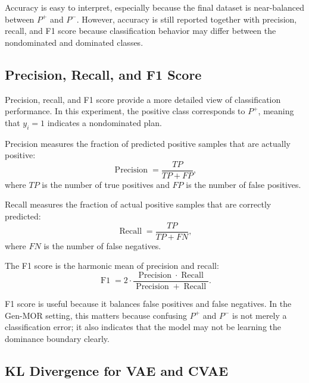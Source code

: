 Accuracy is easy to interpret, especially because the final dataset is near-balanced between $P^{+}$ and $P^{-}$. However, accuracy is still reported together with precision, recall, and F1 score because classification behavior may differ between the nondominated and dominated classes.

\subsection{Precision, Recall, and F1 Score}
\label{subsec:metric_precision_recall_f1}

Precision, recall, and F1 score provide a more detailed view of classification performance. In this experiment, the positive class corresponds to $P^{+}$, meaning that $y_i=1$ indicates a nondominated plan.

Precision measures the fraction of predicted positive samples that are actually positive:
\begin{equation}
    \operatorname{Precision}
    =
    \frac{TP}{TP+FP},
    \label{eq:metric_precision}
\end{equation}
where $TP$ is the number of true positives and $FP$ is the number of false positives.

Recall measures the fraction of actual positive samples that are correctly predicted:
\begin{equation}
    \operatorname{Recall}
    =
    \frac{TP}{TP+FN},
    \label{eq:metric_recall}
\end{equation}
where $FN$ is the number of false negatives.

The F1 score is the harmonic mean of precision and recall:
\begin{equation}
    \operatorname{F1}
    =
    2
    \cdot
    \frac{
        \operatorname{Precision}
        \cdot
        \operatorname{Recall}
    }{
        \operatorname{Precision}
        +
        \operatorname{Recall}
    }.
    \label{eq:metric_f1}
\end{equation}

F1 score is useful because it balances false positives and false negatives. In the Gen-MOR setting, this matters because confusing $P^{+}$ and $P^{-}$ is not merely a classification error; it also indicates that the model may not be learning the dominance boundary clearly.

\subsection{KL Divergence for VAE and CVAE}
\label{subsec:metric_kl_divergence}

